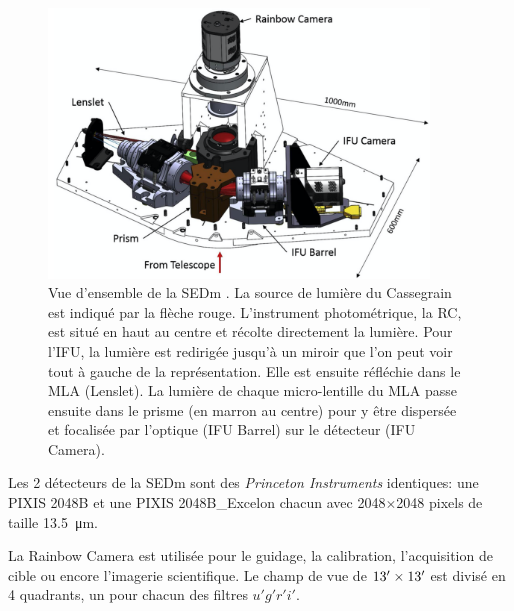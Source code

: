 \documentclass[../main/main.tex]{subfiles}
\begin{document}
\begin{figure}[h]
  \centering
  \includegraphics[width=0.9\textwidth]{../figures/03_sedm/sedmoverview.png}
  \caption[Vue d'ensemble de la SEDm]{Vue d'ensemble de la SEDm
    \citep{SEDM18}. La source de lumière du Cassegrain est indiqué par
    la flèche rouge. L'instrument photométrique, la RC, est situé en
    haut au centre et récolte directement la lumière. Pour l'IFU, la
    lumière est redirigée jusqu'à un miroir que l'on peut voir tout à
    gauche de la représentation. Elle est ensuite réfléchie dans le MLA
    (Lenslet). La lumière de chaque micro-lentille du MLA passe ensuite
    dans le prisme (en marron au centre) pour y être dispersée et
    focalisée par l'optique (IFU Barrel) sur le détecteur (IFU Camera).}
  \label{fig:sedmoverview}
\end{figure}

Les 2 détecteurs de la SEDm sont des \textit{Princeton Instruments} identiques:
une PIXIS 2048B et une PIXIS 2048B\_Excelon chacun avec 2048$\times$2048
pixels de taille \SI{13.5}{\micro\metre}.

La Rainbow Camera est utilisée pour le guidage, la calibration,
l'acquisition de cible ou encore l'imagerie scientifique. Le champ de
vue de $13^\prime\times13^\prime$ est divisé en 4 quadrants, un pour
chacun des filtres $u'g'r'i'$.
\end{document}

